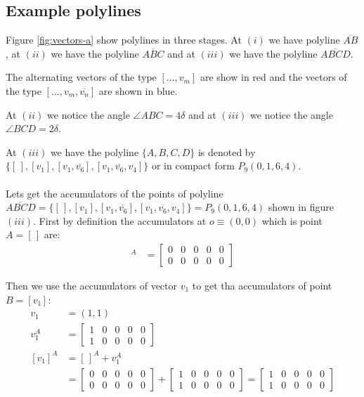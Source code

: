 \documentclass[11pt]{article}
\begin{document}
\subsection{Example polylines}

Figure \ref{fig:vectors-a} show polylines in three stages. At $(i)$ we have polyline $\overline{AB}$, at $(ii)$ we have the polyline $\overline{ABC}$ and at $(iii)$ we have the polyline $\overline{ABCD}$.

The alternating vectors of the type $[...,v_m]$ are show in red and the vectors of the type $[...,v_m,\overline{v_n}]$ are shown in blue.

At $(ii)$ we notice the angle $\angle{ABC} = 4\delta$ and at $(iii)$ we notice the angle $\angle{BCD} = 2\delta$.

At $(iii)$ we have the polyline $\{A,B,C,D\}$ is denoted by $\{ [\hspace{2pt}], [v_1], [v_1, \overline{v_6}], [v_1,\overline{v_6},v_4] \}$ or in compact form $P_9(0,1,6,4)$.
\\\\

Lets get the accumulators of the points of polyline $\overline{ABCD} = \{[\hspace{2pt}], [v_1], [v_1,\overline{v_6}], [v_1,\overline{v_6},v_4]\} = P_9(0,1,6,4)$ shown in figure $(iii)$. First by definition the accumulators at $o \equiv (0,0)$ which is point $A=[\hspace{2pt}]$ are:
\begin{align}
[\hspace{2pt}]^A &= \left[\begin{array}{ccccc}0&0&0&0&0 \\ 0&0&0&0&0 \end{array}\right]
\end{align}

Then we use the accumulators of vector $v_1$ to get tha accumulators of point $B=[v_1]$:
\begin{align}
v_1 &= (1,1) \nonumber\\
v_1^A &= \left[\begin{array}{ccccc}1&0&0&0&0 \\ 1&0&0&0&0 \end{array}\right]\nonumber\\
[v_1]^A &= [\hspace{2pt}]^A + v_1^A\nonumber\\
 &= \left[\begin{array}{ccccc}0&0&0&0&0 \\ 0&0&0&0&0 \end{array}\right]
 + \left[\begin{array}{ccccc}1&0&0&0&0 \\ 1&0&0&0&0 \end{array}\right]
 = \left[\begin{array}{ccccc}1&0&0&0&0 \\ 1&0&0&0&0 \end{array}\right]
\end{align}
\end{document}
